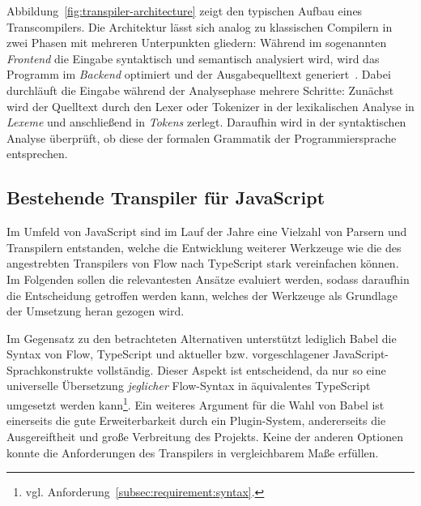 Abbildung~\ref{fig:transpiler-architecture} zeigt den typischen Aufbau eines Transcompilers. Die Architektur lässt sich analog zu klassischen Compilern in zwei Phasen mit mehreren Unterpunkten gliedern: Während im sogenannten \emph{Frontend} die Eingabe syntaktisch und semantisch analysiert wird, wird das Programm im \emph{Backend} optimiert und der Ausgabequelltext generiert~\autocite[6]{TORCZON:2007}. Dabei durchläuft die Eingabe während der Analysephase mehrere Schritte: Zunächst wird der Quelltext durch den Lexer oder Tokenizer in der lexikalischen Analyse in \emph{Lexeme} und anschließend in \emph{Tokens} zerlegt. Daraufhin wird in der syntaktischen Analyse überprüft, ob diese der formalen Grammatik der Programmiersprache entsprechen.




\subsection{Bestehende Transpiler für JavaScript}
\label{subsec:js-transpilers}


Im Umfeld von JavaScript sind im Lauf der Jahre eine Vielzahl von Parsern und Transpilern entstanden, welche die Entwicklung weiterer Werkzeuge wie die des angestrebten Transpilers von Flow nach TypeScript stark vereinfachen können. Im Folgenden sollen die relevantesten Ansätze evaluiert werden, sodass daraufhin die Entscheidung getroffen werden kann, welches der Werkzeuge als Grundlage der Umsetzung heran gezogen wird.




Im Gegensatz zu den betrachteten Alternativen unterstützt lediglich Babel die Syntax von Flow, TypeScript und aktueller bzw. vorgeschlagener JavaScript-Sprachkonstrukte vollständig. Dieser Aspekt ist entscheidend, da nur so eine universelle Übersetzung \emph{jeglicher} Flow-Syntax in äquivalentes TypeScript umgesetzt werden kann\footnote{vgl. Anforderung~\ref{subsec:requirement:syntax}.}.
Ein weiteres Argument für die Wahl von Babel ist einerseits die gute Erweiterbarkeit durch ein Plugin-System, andererseits die Ausgereiftheit und große Verbreitung des Projekts. Keine der anderen Optionen konnte die Anforderungen des Transpilers in vergleichbarem Maße erfüllen.

